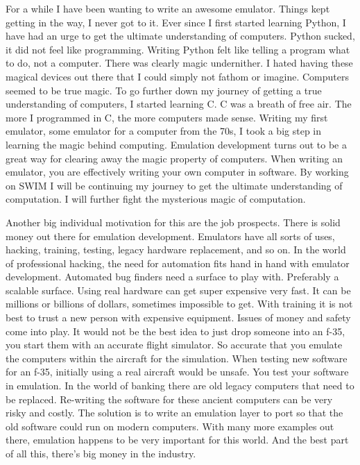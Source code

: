 \documentclass[parskip=half, fontsize=12pt]{scrartcl}
\begin{document}
For a while I have been wanting to write an awesome emulator. Things kept getting in the way, I never got to it. Ever since I first started learning Python, I have had an urge to get the ultimate understanding of computers. Python sucked, it did not feel like programming. Writing Python felt like telling a program what to do, not a computer. There was clearly magic undernither. I hated having these magical devices out there that I could simply not fathom or imagine. Computers seemed to be true magic. To go further down my journey of getting a true understanding of computers, I started learning C. C was a breath of free air. The more I programmed in C, the more computers made sense. Writing my first emulator, some emulator for a computer from the 70s, I took a big step in learning the magic behind computing. Emulation development turns out to be a great way for clearing away the magic property of computers. When writing an emulator, you are effectively writing your own computer in software. By working on SWIM I will be continuing my journey to get the ultimate understanding of computation. I will further fight the mysterious magic of computation.

Another big individual motivation for this are the job prospects. There is solid money out there for emulation development. Emulators have all sorts of uses, hacking, training, testing, legacy hardware replacement, and so on. In the world of professional hacking, the need for automation fits hand in hand with emulator development. Automated bug finders need a surface to play with. Preferably a scalable surface. Using real hardware can get super expensive very fast. It can be millions or billions of dollars, sometimes impossible to get. With training it is not best to trust a new person with expensive equipment. Issues of money and safety come into play. It would not be the best idea to just drop someone into an f-35, you start them with an accurate flight simulator. So accurate that you emulate the computers within the aircraft for the simulation. When testing new software for an f-35, initially using a real aircraft would be unsafe. You test your software in emulation. In the world of banking there are old legacy computers that need to be replaced. Re-writing the software for these ancient computers can be very risky and costly. The solution is to write an emulation layer to port so that the old software could run on modern computers. With many more examples out there, emulation happens to be very important for this world. And the best part of all this, there's big money in the industry.
\end{document}
